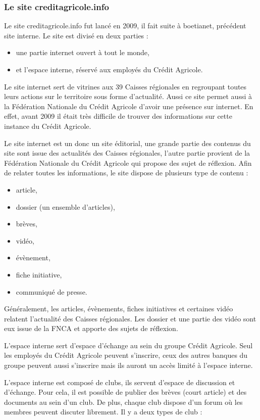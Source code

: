 \documentclass[12pt,a4paper]{article}
\begin{document}
\subsubsection{Le site creditagricole.info}
Le site creditagricole.info fut lancé en 2009, il fait suite à boetianet, précédent site interne. Le site est divisé en deux parties :
\begin{itemize}
\item une partie internet ouvert à tout le monde,
\item et l'espace interne, réservé aux employés du Crédit Agricole.
\end{itemize}\par 
\medskip
Le site internet sert de vitrines aux 39 Caisses régionales en regroupant toutes leurs actions sur le territoire sous forme d'actualité. Aussi ce site permet aussi à la Fédération Nationale du Crédit Agricole d'avoir une présence sur internet. En effet, avant 2009 il était très difficile de trouver des informations sur cette instance du Crédit Agricole.\par
Le site internet est un donc un site éditorial, une grande partie des contenus du site sont issue des actualités des Caisses régionales, l'autre partie provient de la Fédération Nationale du Crédit Agricole qui propose des sujet de réflexion. Afin de relater toutes les informations, le site dispose de plusieurs type de contenu :
\begin{itemize}
\item article,
\item dossier (un ensemble d'articles),
\item brèves,
\item vidéo,
\item évènement,
\item fiche initiative,
\item communiqué de presse.
\end{itemize}\par
Généralement, les articles, évènements, fiches initiatives et certaines vidéo relatent l'actualité des Caisses régionales. Les dossier et une partie des vidéo sont eux issue de la FNCA et apporte des sujets de réflexion.\par
\bigskip
L'espace interne sert d'espace d'échange au sein du groupe Crédit Agricole. Seul les employés du Crédit Agricole peuvent s'inscrire, ceux des autres banques du groupe peuvent aussi s'inscrire mais ils auront un accès limité à l'espace interne.\par 
L'espace interne est composé de clubs, ils servent d'espace de discussion et d'échange. Pour cela, il est possible de publier des brèves (court article) et des documents au sein d'un club. De plus, chaque club dispose d'un forum où les membres peuvent discuter librement. Il y a deux types de club : 
\end{document}
